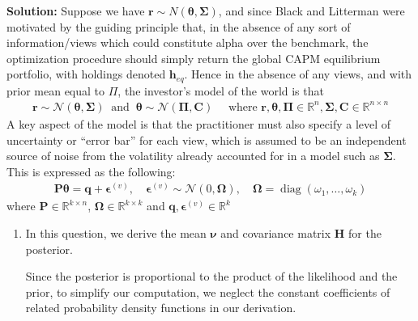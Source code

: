 \documentclass[11pt]{article}
\theoremstyle{plain} %
\newenvironment{solution}
{\color{C2}\normalfont\begin{framed}\begingroup\textbf{Solution:} }
  {\endgroup\end{framed}}
\theoremstyle{remark}
\begin{document}
\begin{solution}
  Suppose we have $\boldsymbol{r} \sim N(\boldsymbol{\theta}, \boldsymbol{\Sigma})$, 
  and since Black and Litterman were motivated by
  the guiding principle that, in the absence of any sort of information/views
  which could constitute alpha over the benchmark, the optimization procedure
  should simply return the global CAPM equilibrium portfolio, with holdings
  denoted $\boldsymbol{h}_{e q}$. Hence in the absence of any views, and with
  prior mean equal to $\Pi$, the investor's model of the world is that
\begin{align}
  \boldsymbol{r} \sim \mathcal{N}(\boldsymbol{\theta}, \boldsymbol{\Sigma}) \  \text { and } \  \boldsymbol{\theta} \sim \mathcal{N}(\boldsymbol{\Pi}, \boldsymbol{C}) \quad \text{ where } \boldsymbol{r}, \boldsymbol{\theta},\boldsymbol{\Pi} \in \mathbb{R}^n, \boldsymbol{\Sigma}, \boldsymbol{C}\in \mathbb{R}^{n\times n}\label{eq:BLB returns}
\end{align}
A key aspect of the model is that the practitioner must also specify a level of
uncertainty or ``error bar'' for each view, which is assumed to be an independent
source of noise from the volatility already accounted for in a model such as
$\boldsymbol{\Sigma}$. This is expressed as the following:
\begin{align}
  \boldsymbol{P} \boldsymbol{\theta}=\boldsymbol{q}+\boldsymbol{\epsilon}^{(v)}, \quad \boldsymbol{\epsilon}^{(v)} \sim \mathcal{N}(0, \boldsymbol{\Omega}), \quad \boldsymbol{\Omega}=\operatorname{diag}\left(\omega_1, \ldots, \omega_k\right) \label{eq:BLB views}
\end{align}
where $\boldsymbol{P} \in \mathbb{R}^{k\times n}$, $\boldsymbol{\Omega} \in \mathbb{R}^{k\times k}$ and $\boldsymbol{q},\boldsymbol{\epsilon}^{(v)} \in \mathbb{R}^k$

  \begin{enumerate}[label=(\alph*)]
    \item In this question, we derive the mean $\boldsymbol{\nu}$ and covariance
    matrix $\boldsymbol{H}$ for the posterior.
    
    Since the posterior is proportional to the product of the likelihood and the
    prior, to simplify our computation, we neglect the constant coefficients of related probability density functions in
    our derivation.


\end{enumerate}
\end{solution}
\end{document}
